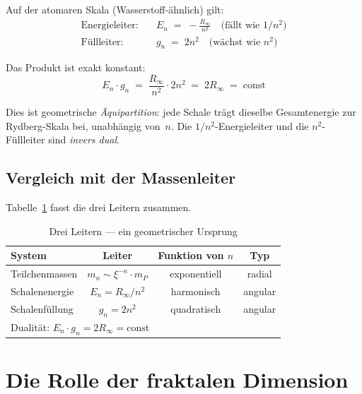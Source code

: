 Auf der atomaren Skala (Wasserstoff-ähnlich) gilt:
\begin{align}
  \text{Energieleiter:} &\quad E_n \;=\; -\frac{R_\infty}{n^2}
    \quad\text{(fällt wie } 1/n^2\text{)} \\
  \text{Füllleiter:}    &\quad g_n \;=\; 2n^2
    \quad\text{(wächst wie } n^2\text{)}
\end{align}

Das Produkt ist exakt konstant:
\begin{equation}
  \boxed{E_n \cdot g_n \;=\; \frac{R_\infty}{n^2} \cdot 2n^2 \;=\; 2R_\infty
  \;=\; \text{const}}
  \label{eq:dualitaet}
\end{equation}

Dies ist geometrische \emph{Äquipartition}: jede Schale trägt dieselbe
Gesamtenergie zur Rydberg-Skala bei, unabhängig von~$n$.
Die $1/n^2$-Energieleiter und die $n^2$-Füllleiter sind \emph{invers dual}.

\subsection{Vergleich mit der Massenleiter}

Tabelle~\ref{tab:vergleich} fasst die drei Leitern zusammen.

\begin{table}[htbp]
\centering
\caption{Drei Leitern — ein geometrischer Ursprung}
\label{tab:vergleich}
\begin{tabular}{lccc}
\hline
System & Leiter & Funktion von $n$ & Typ \\
\hline
Teilchenmassen & $m_n \sim \xi^{-n} \cdot m_P$      & exponentiell & radial \\
Schalenenergie & $E_n = R_\infty / n^2$              & harmonisch   & angular \\
Schalenfüllung & $g_n = 2n^2$                        & quadratisch  & angular \\
\hline
\multicolumn{4}{l}{Dualität: $E_n \cdot g_n = 2R_\infty = \text{const}$} \\
\hline
\end{tabular}
\end{table}

\section{Die Rolle der fraktalen Dimension}
\label{sec:fraktal}


